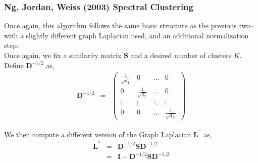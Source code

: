\documentclass[11pt,letterpaper]{article}
\numberwithin{equation}{section}
\begin{document}
\subsubsection{Ng, Jordan, Weiss (2003) Spectral Clustering}
Once again, this algorithm follows the same basic structure as the
previous two--with a slightly different graph Laplacian used, and an
additional normalization step. \\
\indent Once again, we fix a similarity matrix $\boldsymbol{S}$ and
a desired number of clusters $K$.  Define $\boldsymbol{D}^{-1/2}$
as,
\begin{eqnarray}
\boldsymbol{D}^{-1/2} & = & \begin{pmatrix}\frac{1}{\sqrt{d_1}} & 0
& \hdots
& 0 \\
0 & \frac{1}{\sqrt{d_2}}& \hdots & 0 \\
\vdots & \vdots & \ddots & \vdots \\
0 & 0 & \hdots & \frac{1}{\sqrt{d_N}}
\end{pmatrix} \nonumber
\end{eqnarray}

We then compute a different version of the Graph Laplacian
$\boldsymbol{L}^{''}$ as,
\begin{eqnarray}
\boldsymbol{L}^{''} & = & \boldsymbol{D}^{-1/2} \boldsymbol{S}
\boldsymbol{D}^{-1/2} \nonumber \\
& = & \boldsymbol{I} - \boldsymbol{D}^{-1/2} \boldsymbol{S}
\boldsymbol{D}^{-1/2} \nonumber
\end{eqnarray}
\end{document}
